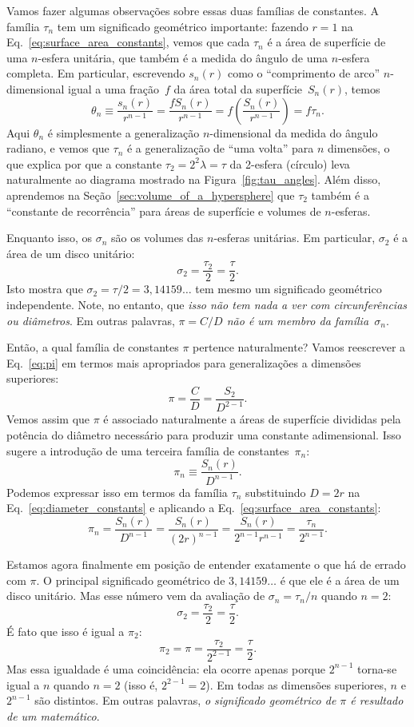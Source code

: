 {Vamos fazer algumas observações sobre essas duas famílias de constantes. A família $\tau_n$ tem um significado geométrico importante: fazendo $r=1$ na Eq.~\eqref{eq:surface_area_constants}, vemos que cada $\tau_n$ é a área de superfície de uma $n$-esfera unitária, que também é a medida do ângulo de uma $n$-esfera completa. Em particular, escrevendo $s_n(r)$ como o ``comprimento de arco'' $n$-dimensional igual a uma fração~$f$ da área total da superfície~$S_n(r)$, temos
\[
\theta_n \equiv \frac{s_n(r)}{r^{n-1}} = \frac{f S_n(r)}{r^{n-1}} = f\left(\frac{S_n(r)}{r^{n-1}}\right) = f\tau_n.
\]
Aqui $\theta_n$ é simplesmente a generalização $n$-dimensional da medida do ângulo radiano, e vemos que $\tau_n$ é a generalização de ``uma volta'' para $n$ dimensões, o que explica por que a constante $\tau_2 = 2^2\lambda = \tau$ da 2-esfera (círculo) leva naturalmente ao diagrama mostrado na Figura~\ref{fig:tau_angles}. Além disso, aprendemos na Seção~\ref{sec:volume_of_a_hypersphere} que $\tau_2$ também é a ``constante de recorrência'' para áreas de superfície e volumes de $n$-esferas.

Enquanto isso, os $\sigma_n$ são os volumes das $n$-esferas unitárias. Em particular, $\sigma_2$ é a área de um disco unitário:
\[
\sigma_2 = \frac{\tau_2}{2} = \frac{\tau}{2}.
\]
Isto mostra que $\sigma_2 = \tau/2 = 3,14159\ldots$ tem mesmo um significado geométrico independente. Note, no entanto, que \emph{isso não tem nada a ver com circunferências ou diâmetros}. Em outras palavras, \emph{$\pi = C/D$ não é um membro da família~$\sigma_n$}.

Então, a qual família de constantes $\pi$ pertence naturalmente?
Vamos reescrever a Eq.~\eqref{eq:pi} em termos mais apropriados para generalizações a dimensões superiores:
\[
\pi = \frac{C}{D} = \frac{S_2}{D^{2-1}}.
\]
Vemos assim que $\pi$ é associado naturalmente a áreas de superfície divididas pela potência do diâmetro necessário para produzir uma constante adimensional. Isso sugere a introdução de uma terceira família de constantes~$\pi_n$:
\begin{equation}
\label{eq:diameter_constants}
\pi_n \equiv \frac{S_n(r)}{D^{n-1}}.
\end{equation}
Podemos expressar isso em termos da família $\tau_n$ substituindo $D = 2r$ na Eq.~\eqref{eq:diameter_constants} e aplicando a Eq.~\eqref{eq:surface_area_constants}:
\[
\pi_n = \frac{S_n(r)}{D^{n-1}} = \frac{S_n(r)}{(2r)^{n-1}} =
\frac{S_n(r)}{2^{n-1}r^{n-1}} = \frac{\tau_n}{2^{n-1}}.
\]

Estamos agora finalmente em posição de entender exatamente o que há de errado com $\pi$. O principal significado geométrico de $3,14159\ldots$ é que ele é a área de um disco unitário. Mas esse número vem da avaliação de $\sigma_n = \tau_n/n$ quando $n=2$:
\[
\sigma_2 = \frac{\tau_2}{2} = \frac{\tau}{2}.
\]
É fato que isso é igual a $\pi_2$:
\[
\pi_2 = \pi = \frac{\tau_2}{2^{2-1}} = \frac{\tau}{2}.
\]
Mas essa igualdade é uma coincidência: ela ocorre apenas porque $2^{n-1}$ torna-se igual a $n$ quando $n=2$ (isso é, $2^{2-1} = 2$). Em todas as dimensões superiores, $n$ e $2^{n-1}$ são distintos. Em outras palavras, \emph{o significado geométrico de $\pi$ é resultado de um  matemático}.

}
